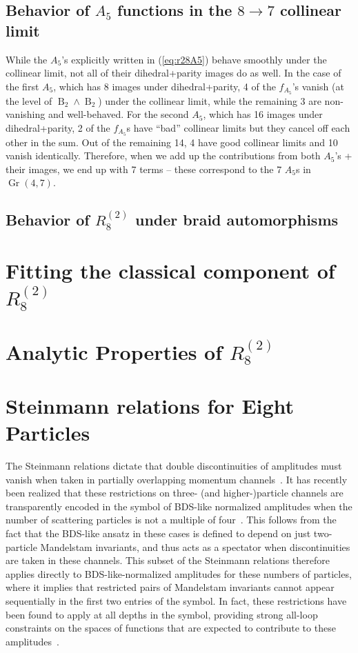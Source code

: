 \documentclass[11pt]{article}
\DeclareMathOperator{\B}{B}
\DeclareMathOperator{\Gr}{Gr}
\def\pdfeq#1{\texorpdfstring{$#1$}{a}}
\begin{document}
\subsection{Behavior of \pdfeq{A_5} functions in the \pdfeq{8\to7} collinear limit}
While the $A_5$'s explicitly written in (\ref{eq:r28A5}) behave smoothly under the collinear limit, not all of their dihedral+parity images do as well. In the case of the first $A_5$, which has 8 images under dihedral+parity, 4 of the $f_{A_5}$'s vanish (at the level of $\B_2 \wedge \B_2$) under the collinear limit, while the remaining 3 are non-vanishing and well-behaved. For the second $A_5$, which has 16 images under dihedral+parity, 2 of the $f_{A_5}$s have ``bad'' collinear limits but they cancel off each other in the sum. Out of the remaining 14, 4 have good collinear limits and 10 vanish identically. Therefore, when we add up the contributions from both $A_5$'s + their images, we end up with 7 terms -- these correspond to the 7 $A_5$s in $\Gr(4,7)$. 

\subsection{Behavior of \pdfeq{R_8^{(2)}} under braid automorphisms}

\section{Fitting the classical component of \pdfeq{R_8^{(2)}}}

\section{Analytic Properties of \pdfeq{R_8^{(2)}}}

\section{Steinmann relations for Eight Particles}

The Steinmann relations dictate that double discontinuities of amplitudes must vanish when taken in partially overlapping momentum channels~\cite{Steinmann,Cahill:1973qp}. It has recently been realized that these restrictions on three- (and higher-)particle channels are transparently encoded in the symbol of BDS-like normalized amplitudes when the number of scattering particles is not a multiple of four~\cite{Caron-Huot:2016owq, Dixon:2016nkn}. This follows from the fact that the BDS-like ansatz in these cases is defined to depend on just two-particle Mandelstam invariants, and thus acts as a spectator when discontinuities are taken in these channels. This subset of the Steinmann relations therefore applies directly to BDS-like-normalized amplitudes for these numbers of particles, where it implies that restricted pairs of Mandelstam invariants cannot appear sequentially in the first two entries of the symbol. In fact, these restrictions have been found to apply at all depths in the symbol, providing strong all-loop constraints on the spaces of functions that are expected to contribute to these amplitudes~\cite{omega_paper,cosmic_galois_paper}. 
\end{document}
